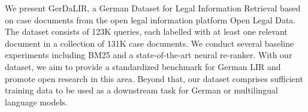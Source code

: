We present GerDaLIR, a German Dataset for Legal Information Retrieval based on case documents from the open legal information platform Open Legal Data. The dataset consists of 123K queries, each labelled with at least one relevant document in a collection of 131K case documents. We conduct several baseline experiments including BM25 and a state-of-the-art neural re-ranker. With our dataset, we aim to provide a standardized benchmark for German LIR and promote open research in this area. Beyond that, our dataset comprises sufficient training data to be used as a downstream task for German or multilingual language models.
